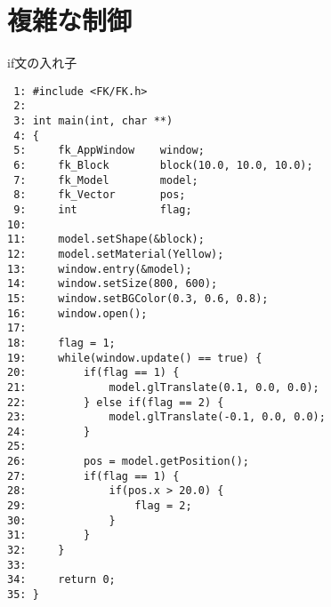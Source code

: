 \section{複雑な制御} \label{sec:03-nest}
\begin{itembox}[l]{if文の入れ子} \label{sec:03-pos}
\begin{verbatim}
 1: #include <FK/FK.h>
 2: 
 3: int main(int, char **)
 4: {
 5:     fk_AppWindow    window;
 6:     fk_Block        block(10.0, 10.0, 10.0);
 7:     fk_Model        model;
 8:     fk_Vector       pos;
 9:     int             flag;
10: 
11:     model.setShape(&block);
12:     model.setMaterial(Yellow);
13:     window.entry(&model);
14:     window.setSize(800, 600);
15:     window.setBGColor(0.3, 0.6, 0.8);
16:     window.open();
17: 
18:     flag = 1;
19:     while(window.update() == true) {
20:         if(flag == 1) {
21:             model.glTranslate(0.1, 0.0, 0.0);
22:         } else if(flag == 2) {
23:             model.glTranslate(-0.1, 0.0, 0.0);
24:         }
25: 
26:         pos = model.getPosition();
27:         if(flag == 1) {
28:             if(pos.x > 20.0) {
29:                 flag = 2;
30:             }
31:         }
32:     }
33: 
34:     return 0;
35: }
\end{verbatim}
\end{itembox}

